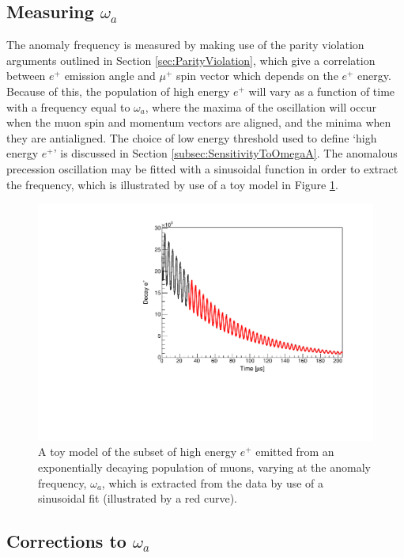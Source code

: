 \subsection{Measuring $\omega_{a}$}

The anomaly frequency is measured by making use of the parity violation arguments outlined in Section \ref{sec:ParityViolation}, which give a correlation between $e^{+}$ emission angle and $\mu^{+}$ spin vector which depends on the $e^{+}$ energy. Because of this, the population of high energy $e^{+}$ will vary as a function of time with a frequency equal to $\omega_{a}$, where the maxima of the oscillation will occur when the muon spin and momentum vectors are aligned, and the minima when they are antialigned. The choice of low energy threshold used to define `high energy $e^{+}$' is discussed in Section \ref{subsec:SensitivityToOmegaA}. The anomalous precession oscillation may be fitted with a sinusoidal function in order to extract the frequency, which is illustrated by use of a toy model in Figure \ref{fig:ToyWiggle}. 

\begin{figure}[t!]
\centering{}
\includegraphics[trim={0cm 0cm 0cm 0cm},clip,width=.69\textwidth]{Images/Chapter2/ToyWiggle.pdf}
\caption{A toy model of the subset of high energy $e^{+}$ emitted from an exponentially decaying population of muons, varying at the anomaly frequency, $\omega_{a}$, which is extracted from the data by use of a sinusoidal fit (illustrated by a red curve).}
\label{fig:ToyWiggle}
\end{figure}

\subsection{Corrections to $\omega_{a}$}\label{sec:OmegaACorrections}

